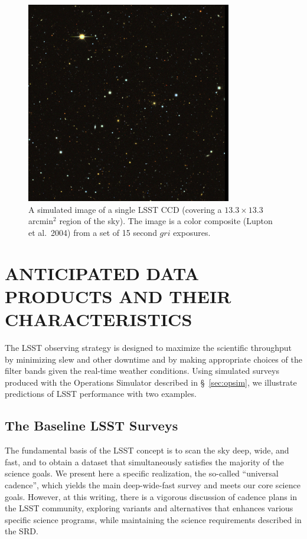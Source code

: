 \documentclass{emulateapj}
\begin{document}
\begin{figure}
\centerline{\includegraphics[width=0.8\textwidth,clip]{chip2014.jpg}}
\caption{ A simulated image of a single LSST CCD (covering a
  $13.3\times13.3$ arcmin$^2$ region of the sky). The image is a color
  composite (Lupton et al.~2004) from a set of 15 second $gri$ exposures.}
\label{Fig:ImSimExample}
\end{figure}



\section{    ANTICIPATED DATA PRODUCTS AND THEIR CHARACTERISTICS    }
\label{Sec:dataprod}

The LSST observing strategy is designed to maximize the scientific
throughput by minimizing slew and other downtime and by making appropriate
choices of the filter bands given the real-time weather conditions.
Using simulated surveys produced with the Operations Simulator described in \S~\ref{sec:opsim}, 
we illustrate predictions of LSST performance with two examples. 


\subsection{ The Baseline LSST Surveys }

The fundamental basis of the LSST concept is to scan the sky deep, wide, and
fast, and to obtain a dataset that simultaneously satisfies the majority
of the science goals. We present here a specific realization, the
so-called ``universal cadence'', which yields the main deep-wide-fast
survey and meets our core science goals.  However, at this writing,
there is a vigorous discussion of cadence plans in the LSST community,
exploring variants and alternatives that enhances various specific
science programs, while maintaining the science requirements described
in the SRD.  
\end{document}
